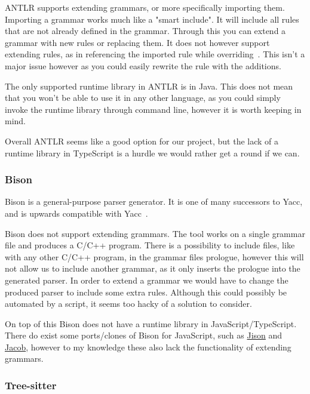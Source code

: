 ANTLR supports extending grammars, or more specifically importing them.
Importing a grammar works much like a "smart include".
It will include all rules that are not already defined in the grammar.
Through this you can extend a grammar with new rules or replacing them.
It does not however support extending rules, as in referencing the imported rule while overriding~\cite{Terence2012}.
This isn't a major issue however as you could easily rewrite the rule with the additions.

The only supported runtime library in ANTLR is in Java.
This does not mean that you won't be able to use it in any other language, as you could simply invoke the runtime library through command line, however it is worth keeping in mind.

Overall ANTLR seems like a good option for our project, but the lack of a runtime library in TypeScript is a hurdle we would rather get a round if we can.

\subsubsection{Bison}\label{subsubsec:bison}

Bison is a general-purpose parser generator.
It is one of many successors to Yacc, and is upwards compatible with Yacc~\cite{bison}.

Bison does not support extending grammars.
The tool works on a single grammar file and produces a C/C++ program.
There is a possibility to include files, like with any other C/C++ program, in the grammar files prologue, however this will not allow us to include another grammar, as it only inserts the prologue into the generated parser.
In order to extend a grammar we would have to change the produced parser to include some extra rules.
Although this could possibly be automated by a script, it seems too hacky of a solution to consider.

On top of this Bison does not have a runtime library in JavaScript/TypeScript.
There do exist some ports/clones of Bison for JavaScript, such as \href{http://zaa.ch/jison/}{Jison} and \href{http://canna71.github.io/Jacob/}{Jacob}, however to my knowledge these also lack the functionality of extending grammars.

\subsubsection{Tree-sitter}\label{subsubsec:tree-sitter}

